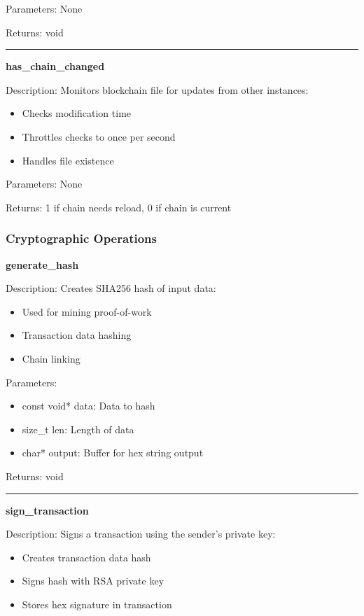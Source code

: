 \documentclass[12pt]{article}
\begin{document}
Parameters: None

Returns: void

\vspace{1em}
\hrule
\vspace{1em}

\textbf{has\_chain\_changed}

Description: Monitors blockchain file for updates from other instances:
\begin{itemize}
\item Checks modification time
\item Throttles checks to once per second
\item Handles file existence
\end{itemize}

Parameters: None

Returns: 1 if chain needs reload, 0 if chain is current

\subsubsection{Cryptographic Operations}
\textbf{generate\_hash}

Description: Creates SHA256 hash of input data:
\begin{itemize}
\item Used for mining proof-of-work
\item Transaction data hashing
\item Chain linking
\end{itemize}

Parameters:
\begin{itemize}
\item const void* data: Data to hash
\item size\_t len: Length of data
\item char* output: Buffer for hex string output
\end{itemize}

Returns: void

\vspace{1em}
\hrule
\vspace{1em}

\textbf{sign\_transaction}

Description: Signs a transaction using the sender's private key:
\begin{itemize}
\item Creates transaction data hash
\item Signs hash with RSA private key
\item Stores hex signature in transaction
\end{itemize}
\end{document}
